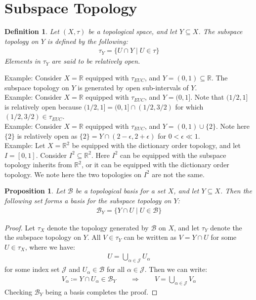 \documentclass[11pt]{book}
\theoremstyle{break}
\theoremstyle{break}
\newtheorem{prop}[lem]{Proposition}
\newtheorem{defn}{Definition}[corL]
\newcommand{\R}{\mathbb{R}}
\newcommand{\example}{\color{green}Example: \color{black}}
\begin{document}
\newpage
\section[Subspace Topology]{\color{red} Subspace Topology \color{black}}
\begin{defn}
Let $(X,\tau)$ be a topological space, and let $Y \subseteq X$. The subspace topology on $Y$ is defined by the following:
\begin{align*}
\tau_Y = \{ U \cap Y \mid U \in \tau\}
\end{align*}
Elements in $\tau_Y$ are said to be relatively open. 
\end{defn}

\example Consider $X = \R$ equipped with $\tau_{EUC}$, and $Y = (0,1) \subseteq \R$. The subspace topology on $Y$ is generated by open sub-intervals of $Y$.\\

\example Consider $X = \R$ equipped with $\tau_{EUC}$, and $Y = (0,1]$. Note that $(1/2, 1]$ is relatively open because $(1/2,1] = (0,1] \cap (1/2, 3/2)$ for which $(1/2, 3/2) \in \tau_{EUC}$.\\

\example Consider $X = \R$ equipped with $\tau_{EUC}$, and $Y = (0,1)\cup \{2\}$. Note here $\{2\}$ is relatively open as $\{2 \} = Y \cap (2-\epsilon, 2+\epsilon)$ for $0<\epsilon \ll 1$.\\

\example Let $X = \R^2$ be equipped with the dictionary order topology, and let $I = [0,1]$. Consider $I^2 \subseteq \R^2$. Here $I^2$ can be equipped with the subspace topology inherits from $\R^2$, or it can be equipped with the dictionary order topology. We note here the two topologies on $I^2$ are not the same.\\

\begin{prop}
Let $\mathcal{B}$ be a topological basis for a set $X$, and let $Y \subseteq X$. Then the following set forms a basis for the subspace topology on $Y$:
\begin{align*}
\mathcal{B}_Y = \{ Y \cap U \mid U \in \mathcal{B}\}
\end{align*}
\end{prop}
\begin{proof}
Let $\tau_X$ denote the topology generated by $\mathcal{B}$ on $X$, and let $\tau_Y$ denote the the subspace topology on $Y$. All $V \in\tau_Y$ can be written as $V = Y \cap U$ for some $U \in \tau_X$, where we have:
\begin{align*}
U = \bigcup_{\alpha \in \mathcal{J}} U_\alpha
\end{align*}
for some index set $\mathcal{J}$ and $U_\alpha \in \mathcal{B}$ for all $\alpha \in \mathcal{J}$. Then we can write:
\begin{align*}
V_\alpha \coloneqq Y \cap U_\alpha \in \mathcal{B}_Y \qquad \Rightarrow \qquad V = \bigcup_{\alpha \in \mathcal{J}} V_\alpha
\end{align*}
Checking $\mathcal{B}_Y$ being a basis completes the proof. 
\end{proof}
\end{document}
